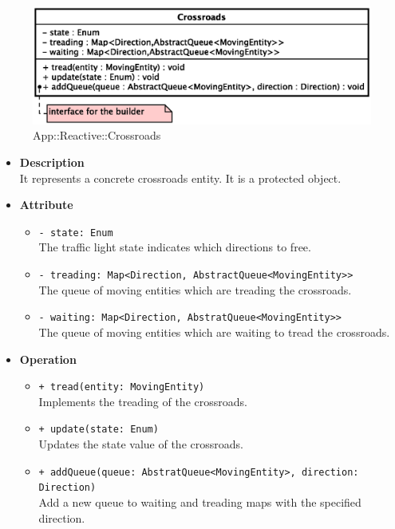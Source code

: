 \begin{figure}[h]
\centering
\includegraphics[scale=0.6,keepaspectratio]{images/solution/crossroads.eps}
\caption{App::Reactive::Crossroads}
\label{fig:sd-app-crossroads}
\end{figure}
\FloatBarrier
\begin{itemize}
  \item \textbf{Description} \\
    It represents a concrete crossroads entity. It is a protected object.
  \item \textbf{Attribute}
  \begin{itemize}
    \item \texttt{- state: Enum} \\
The traffic light state indicates which directions to free.
    \item \texttt{- treading: Map<Direction, AbstractQueue<MovingEntity>>} \\
The queue of moving entities which are treading the crossroads.
    \item \texttt{- waiting: Map<Direction, AbstratQueue<MovingEntity>>} \\
The queue of moving entities which are waiting to tread the crossroads. 
  \end{itemize}
  \item \textbf{Operation}
  \begin{itemize} 
    \item \texttt{+ tread(entity: MovingEntity)} \\
Implements the treading of the crossroads.
    \item \texttt{+ update(state: Enum)} \\
Updates the state value of the crossroads.
    \item \texttt{+ addQueue(queue: AbstratQueue<MovingEntity>, direction: 
Direction)} \\
Add a new queue to waiting and treading maps with the specified direction.
  \end{itemize}
\end{itemize}
